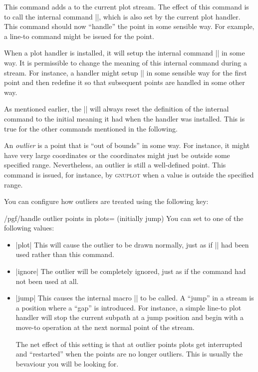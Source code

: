 \begin{command}{\pgfplotstreampoint{}}
  This command adds a  to the current plot stream. The
  effect of this command is to call the internal command |\pgf@plotstreampoint|,
  which is also set by the current plot handler. This command should
  now ``handle'' the point in some sensible way. For example, a
  line-to command might be issued for the point.
  
  When a plot handler is installed, it will setup the internal command
  |\pgf@plotstreampoint| in some way. It is permissible to change the
  meaning of this internal command during a stream. For instance, a
  handler might setup |\pgf@plotstreampoint| in some sensible way for
  the first point and then redefine it so that subsequent points are
  handled in some other way.

  As mentioned earlier, the |\pgfplotstreamstart| will always reset
  the definition of the internal command to the initial meaning it had
  when the handler was installed. This is true for the other commands
  mentioned in the following.
\end{command}

\begin{command}{\pgfplotstreampointoutlier{}}
  An \emph{outlier} is a point that is ``out of bounds'' in some
  way. For instance, it might have very large coordinates or the
  coordinates might just be outside some specified
  range. Nevertheless, an outlier is still a well-defined point. This
  command is issued, for instance, by \textsc{gnuplot} when a value is
  outside the specified range.

  You can configure how outliers are treated using the following key:
  \begin{key}{/pgf/handle outlier points in plots=
      (initially jump)}
    You can set  to one of the following values:
    \begin{itemize}
    \item |plot| This will cause the outlier to be drawn normally,
      just as if |\pgfplotstreampoint| had been used rather than this
      command.
    \item |ignore| The outlier will be completely ignored, just as if
      the command had not been used at all.
    \item |jump| This causes the internal macro |\pgf@plotstreamjump|
      to be called. A ``jump'' in a stream is a position where a
      ``gap'' is introduced. For instance, a simple line-to plot
      handler will stop the current subpath at a jump position and
      begin with a move-to operation at the next normal point of the
      stream.

      The net effect of this setting is that at outlier points plots
      get interrupted and ``restarted'' when the points are no longer
      outliers. This is usually the bevaviour you will be looking for.
    \end{itemize}
  \end{key}
\end{command}

